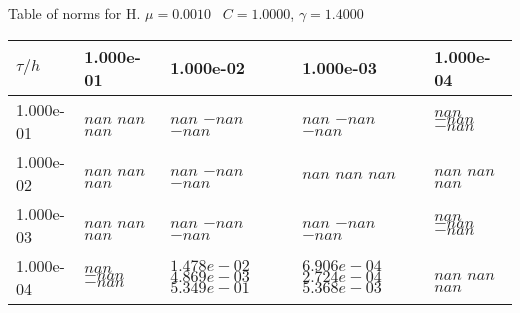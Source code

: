 \begin{center}
Table of norms for H. $\mu = 0.0010$ \, $C = 1.0000$, $\gamma = 1.4000$
  
\begin{tabular}{|p{1in}|p{1in}|p{1in}|p{1in}|p{1in}|} \hline
$\tau / h$ &1.000e-01 &1.000e-02 &1.000e-03 &1.000e-04 \\ \hline 
1.000e-01 & $nan$  $nan$  $nan$  & $nan$  $-nan$  $-nan$  & $nan$  $-nan$  $-nan$  & $nan$  $-nan$  $-nan$  \\ \hline 
1.000e-02 & $nan$  $nan$  $nan$  & $nan$  $-nan$  $-nan$  & $nan$  $nan$  $nan$  & $nan$  $nan$  $nan$  \\ \hline 
1.000e-03 & $nan$  $nan$  $nan$  & $nan$  $-nan$  $-nan$  & $nan$  $-nan$  $-nan$  & $nan$  $-nan$  $-nan$  \\ \hline 
1.000e-04 & $nan$  $-nan$  $-nan$  & $1.478e-02$  $4.869e-03$  $5.349e-01$  & $6.906e-04$  $2.724e-04$  $5.368e-03$  & $nan$  $nan$  $nan$  \\ \hline 

\end{tabular}\\[20pt]
\end{center}
